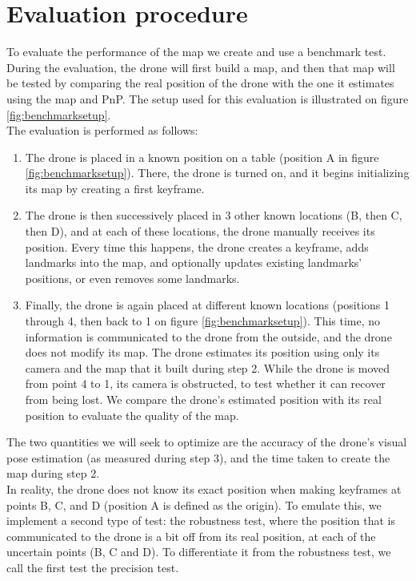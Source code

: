 \section{Evaluation procedure} \label{evalproc}
To evaluate the performance of the map we create and use a benchmark test.\\
During the evaluation, the drone will first build a map, and then that map will be tested by comparing the real position of the drone with the one it estimates using the map and PnP. The setup used for this evaluation is illustrated on figure \ref{fig:benchmarksetup}.\\
The evaluation is performed as follows:
\begin{enumerate}
  \item The drone is placed in a known position on a table (position A in figure \ref{fig:benchmarksetup}). There, the drone is turned on, and it begins initializing its map by creating a first keyframe.
  \item The drone is then successively placed in 3 other known locations (B, then C, then D), and at each of these locations, the drone manually receives its position. Every time this happens, the drone creates a keyframe, adds landmarks into the map, and optionally updates existing landmarks' positions, or even removes some landmarks.
  \item Finally, the drone is again placed at different known locations (positions 1 through 4, then back to 1 on figure \ref{fig:benchmarksetup}). This time, no information is communicated to the drone from the outside, and the drone does not modify its map. The drone estimates its position using only its camera and the map that it built during step 2. While the drone is moved from point 4 to 1, its camera is obstructed, to test whether it can recover from being lost. We compare the drone's estimated position with its real position to evaluate the quality of the map.
\end{enumerate}
The two quantities we will seek to optimize are the accuracy of the drone's visual pose estimation (as measured during step 3), and the time taken to create the map during step 2.\\
In reality, the drone does not know its exact position when making keyframes at points B, C, and D (position A is defined as the origin). To emulate this, we implement a second type of test: the robustness test, where the position that is communicated to the drone is a bit off from its real position, at each of the uncertain points (B, C and D). To differentiate it from the robustness test, we call the first test the precision test.\\
